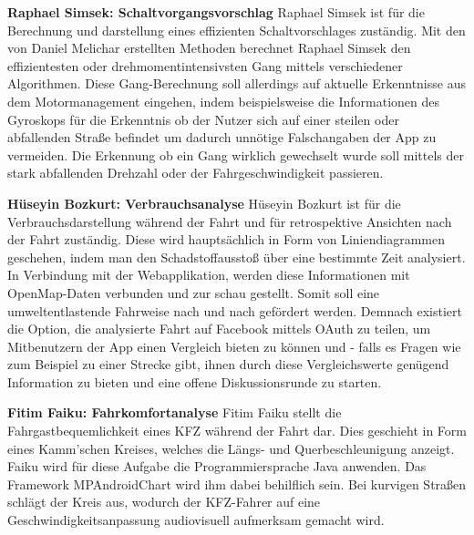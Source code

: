 	\textbf{Raphael Simsek: Schaltvorgangsvorschlag\newline}
	Raphael Simsek ist für die Berechnung und darstellung eines effizienten Schaltvorschlages zuständig.
	Mit den von Daniel Melichar erstellten Methoden berechnet Raphael Simsek den effizientesten oder drehmomentintensivsten Gang mittels verschiedener Algorithmen. Diese Gang-Berechnung soll allerdings auf aktuelle Erkenntnisse aus dem Motormanagement eingehen, indem beispielsweise die Informationen des Gyroskops für die Erkenntnis ob der Nutzer sich auf einer steilen oder abfallenden Straße befindet um dadurch unnötige Falschangaben der App zu vermeiden. Die Erkennung ob ein Gang wirklich gewechselt wurde soll mittels der stark abfallenden Drehzahl oder der Fahrgeschwindigkeit passieren.
	
	\clearpage

	\textbf{Hüseyin Bozkurt: Verbrauchsanalyse\newline}
	 Hüseyin Bozkurt ist für die Verbrauchsdarstellung während der Fahrt und für retrospektive Ansichten nach der Fahrt zuständig.
	 Diese wird hauptsächlich in Form von Liniendiagrammen geschehen, indem man den Schadstoffausstoß über eine bestimmte Zeit analysiert. In Verbindung mit der Webapplikation, werden diese Informationen mit OpenMap-Daten verbunden und zur schau gestellt.
	 Somit soll eine umweltentlastende Fahrweise nach und nach gefördert werden. Demnach existiert die Option, die analysierte Fahrt auf Facebook mittels OAuth zu teilen, um Mitbenutzern der App einen Vergleich bieten zu können und - falls es Fragen wie zum Beispiel zu einer Strecke gibt, ihnen durch diese Vergleichswerte genügend Information zu bieten und eine offene Diskussionsrunde zu starten.
	
	\textbf{Fitim Faiku: Fahrkomfortanalyse\newline}
	 Fitim Faiku stellt die Fahrgastbequemlichkeit eines KFZ während der Fahrt dar.
	 Dies geschieht in Form eines Kamm'schen Kreises, welches die Längs- und Querbeschleunigung anzeigt. Faiku wird für diese Aufgabe die Programmiersprache Java anwenden.
	 Das Framework MPAndroidChart wird ihm dabei behilflich sein. Bei kurvigen Straßen schlägt der Kreis aus, wodurch der KFZ-Fahrer auf eine Geschwindigkeitsanpassung audiovisuell aufmerksam gemacht wird.
